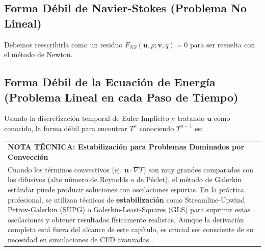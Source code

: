 \subsection{Forma Débil de Navier-Stokes (Problema No Lineal)}
Debemos reescribirla como un residuo \(F_{NS}(\bm{u}, p; \bm{v}, q) = 0\) para ser resuelta con el método de Newton.
\begin{center}
\end{center}

\subsection{Forma Débil de la Ecuación de Energía (Problema Lineal en cada Paso de Tiempo)}
Usando la discretización temporal de Euler Implícito y tratando \(\bm{u}\) como conocido, la forma débil para encontrar \(T^n\) conociendo \(T^{n-1}\) es:
\begin{center}
\end{center}

\begin{center}
\begin{tabular}{|p{}|}
\hline
\textbf{NOTA TÉCNICA: Estabilización para Problemas Dominados por Convección} \\
Cuando los términos convectivos (ej. \(\bm{u} \cdot \nabla T\)) son muy grandes comparados con los difusivos (alto número de Reynolds o de Péclet), el método de Galerkin estándar puede producir soluciones con oscilaciones espurias. En la práctica profesional, se utilizan técnicas de \textbf{estabilización} como Streamline-Upwind Petrov-Galerkin (SUPG) o Galerkin-Least-Squares (GLS) para suprimir estas oscilaciones y obtener resultados físicamente realistas. Aunque la derivación completa está fuera del alcance de este capítulo, es crucial ser consciente de su necesidad en simulaciones de CFD avanzadas \cite{Versteeg2007}. \\
\hline
\end{tabular}
\end{center}